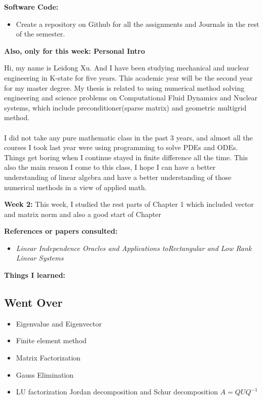 \documentclass{article}
\begin{document}
\textbf{Software Code:}
 \begin{itemize}
\item Create a repository on Github for all the assignments and Journals in the rest of the semester.
\end{itemize}


\textbf{Also, only for this week: Personal Intro}

Hi, my name is Leidong Xu. And I have been studying mechanical and nuclear engineering in K-state for five years. This academic year will be the second year for my master degree. My thesis is related to using numerical method solving engineering and science problems on Computational Fluid Dynamics and Nuclear systems, which include preconditioner(sparse matrix) and geometric multigrid method.\\ \\ I did not take any pure mathematic class in the past 3 years, and almost all the courses I took last year were using programming to solve PDEs and ODEs. Things get boring when I continue stayed in finite difference all the time. This also the main reason I come to this class, I hope I can have a better understanding of linear algebra and have a better understanding of those numerical methods in a view of applied math.   


\newpage 

\textbf{Week 2:}
This week, I studied the rest parts of Chapter 1 which included vector and matrix norm and also a good start of Chapter


\textbf{References or papers consulted:}
\begin{itemize}

\item {\em Linear Independence Oracles and Applications toRectangular and Low Rank Linear Systems}

\end{itemize}

\textbf{Things I learned:}
\subsection*{Went Over}
\begin{itemize}
\item Eigenvalue and Eigenvector
\item Finite element method
\item Matrix Factorization
\item Gauss Elimination 
\item LU factorization Jordan decomposition and Schur decomposition $A = QUQ^{-1}$
\end{itemize}
\end{document}
